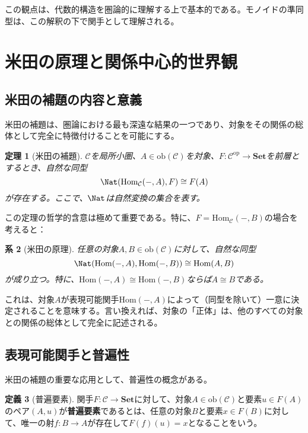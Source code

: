 \documentclass[11pt,a4paper,twocolumn]{ltjsarticle}
\theoremstyle{definition}
\newtheorem{definition}{定義}[section]
\theoremstyle{plain}
\newtheorem{theorem}[definition]{定理}
\newtheorem{corollary}[definition]{系}
\newcommand{\Set}{\mathbf{Set}}
\newcommand{\Hom}{\mathrm{Hom}}
\newcommand{\ob}{\mathrm{ob}}
\newcommand{\op}{\mathrm{op}}
\begin{document}
この観点は、代数的構造を圏論的に理解する上で基本的である。モノイドの準同型は、この解釈の下で関手として理解される。

\section{米田の原理と関係中心的世界観}

\subsection{米田の補題の内容と意義}

米田の補題は、圏論における最も深遠な結果の一つであり、対象をその関係の総体として完全に特徴付けることを可能にする。

\begin{theorem}[米田の補題]
$\mathcal{C}$を局所小圏、$A \in \ob(\mathcal{C})$を対象、$F: \mathcal{C}^{\op} \to \Set$を前層とするとき、自然な同型
\[
\Nat(\Hom_{\mathcal{C}}(-, A), F) \cong F(A)
\]
が存在する。ここで、$\Nat$は自然変換の集合を表す。
\end{theorem}

この定理の哲学的含意は極めて重要である。特に、$F = \Hom_{\mathcal{C}}(-, B)$の場合を考えると：

\begin{corollary}[米田の原理]
任意の対象$A, B \in \ob(\mathcal{C})$に対して、自然な同型
\[
\Nat(\Hom(-, A), \Hom(-, B)) \cong \Hom(A, B)
\]
が成り立つ。特に、$\Hom(-, A) \cong \Hom(-, B)$ならば$A \cong B$である。
\end{corollary}

これは、対象$A$が表現可能関手$\Hom(-, A)$によって（同型を除いて）一意に決定されることを意味する。言い換えれば、対象の「正体」は、他のすべての対象との関係の総体として完全に記述される。

\subsection{表現可能関手と普遍性}

米田の補題の重要な応用として、普遍性の概念がある。

\begin{definition}[普遍要素]
関手$F: \mathcal{C} \to \Set$に対して、対象$A \in \ob(\mathcal{C})$と要素$u \in F(A)$のペア$(A, u)$が\textbf{普遍要素}であるとは、任意の対象$B$と要素$x \in F(B)$に対して、唯一の射$f: B \to A$が存在して$F(f)(u) = x$となることをいう。
\end{definition}
\end{document}

